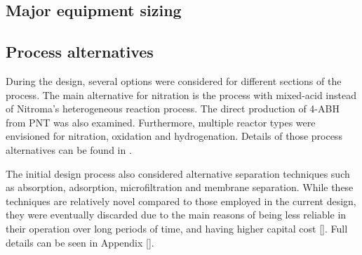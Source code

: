 
\subsection{Major equipment sizing}


\subsection{Process alternatives}
During the design, several options were considered for different sections of the process. The main alternative for nitration is the process with mixed-acid instead of Nitroma's heterogeneous reaction process. The direct production of 4-ABH from PNT was also examined. Furthermore, multiple reactor types were envisioned for nitration, oxidation and hydrogenation. Details of those process alternatives can be found in .

The initial design process also considered alternative separation techniques such as absorption, adsorption, microfiltration and membrane separation. While these techniques are relatively novel compared to those employed in the current design, they were eventually discarded due to the main reasons of being less reliable in their operation over long periods of time, and having higher capital cost []. Full details can be seen in Appendix [].



